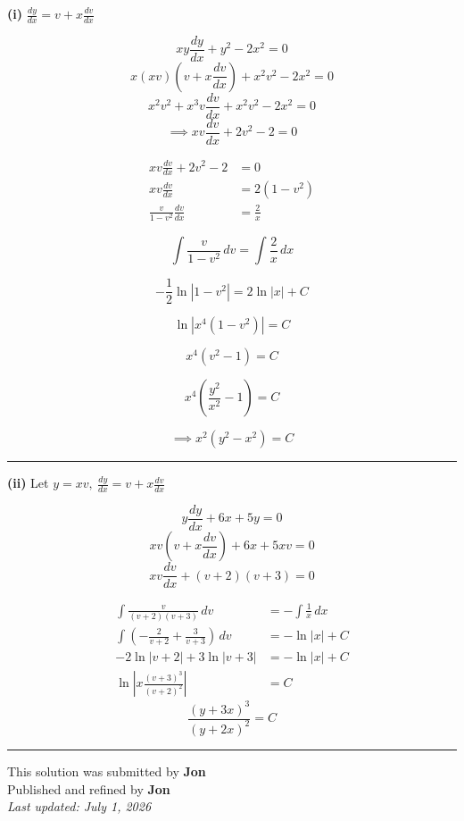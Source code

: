 \documentclass[12pt]{article}
\begin{document}
\newcommand{\ds}{\displaystyle}

\textbf{(i)} $\ds\frac{dy}{dx}=v+x\frac{dv}{dx}$

$$xy\frac{dy}{dx}+y^2-2x^2=0$$
$$x(xv)\left(v+x\frac{dv}{dx}\right)+x^2v^2-2x^2=0$$
$$x^2v^2+x^3v\frac{dv}{dx}+x^2v^2-2x^2=0$$
$$\implies xv\frac{dv}{dx}+2v^2-2=0$$

\begin{align*}
xv\frac{dv}{dx}+2v^2-2&=0\\
xv\frac{dv}{dx}&=2(1-v^2)\\
\frac{v}{1-v^2}\frac{dv}{dx}&=\frac2x
\end{align*}

$$\int \frac{v}{1-v^2}\,dv=\int \frac2x\,dx$$

$$-\frac12\ln|1-v^2|=2\ln|x|+C$$

$$\ln|x^4(1-v^2)|=C$$

$$x^4(v^2-1)=C$$

$$x^4\left(\frac{y^2}{x^2}-1\right)=C$$

$$\implies x^2(y^2-x^2)=C$$

\bigskip\hrule\bigskip

\textbf{(ii)} Let $\ds y=xv,\ \frac{dy}{dx}=v+x\frac{dv}{dx}$

$$y\frac{dy}{dx}+6x+5y=0$$
$$xv\left(v+x\frac{dv}{dx}\right)+6x+5xv=0$$
$$xv\frac{dv}{dx}+(v+2)(v+3)=0$$

\begin{align*}
\int \frac{v}{(v+2)(v+3)}\,dv
&=-\int\frac1x\,dx\\
\int\left(-\frac2{v+2}+\frac3{v+3}\right)\,dv
&=-\ln|x|+C\\
-2\ln|v+2|+3\ln|v+3|
&=-\ln|x|+C\\
\ln\left|x\frac{(v+3)^3}{(v+2)^2}\right|&=C
\end{align*}
$$\frac{(y+3x)^3}{(y+2x)^2}=C$$

\bigskip
\hrule
\begin{center}
    This solution was submitted by \textbf{Jon}\\[4pt]
    Published and refined by \textbf{Jon}\\[8pt]
    \textit{Last updated: July 1, 2026}
\end{center}
\end{document}
